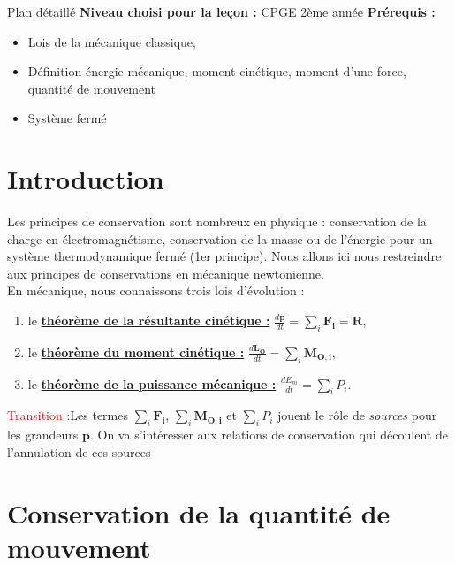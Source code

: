 \begin{reportBlock}{Plan détaillé}
  \textbf{Niveau choisi pour la leçon :} CPGE 2ème année
  \newline
  \textbf{Prérequis : }
  \begin{itemize}
      \item Lois de la mécanique classique,
      \item Définition énergie mécanique, moment cinétique, moment d'une force, quantité de mouvement
      \item Système fermé
  \end{itemize}


\section*{Introduction}
Les principes de conservation sont nombreux en physique : conservation de la charge en électromagnétisme, conservation de la masse ou de l'énergie pour un système thermodynamique fermé (1er principe). Nous allons ici nous restreindre aux principes de conservations en mécanique newtonienne.\\

En mécanique, nous connaissons trois lois d'évolution :
\begin{enumerate}
    \item le \underline{\textbf{théorème de la résultante cinétique :}} $\frac{d\mathbf{p}}{dt}=\sum_{i}\mathbf{F_i}=\mathbf{R}$,
    \item le \underline{\textbf{théorème du moment cinétique :}} $\frac{d\mathbf{L_O}}{dt}=\sum_{i}\mathbf{M_{O,i}}$,
    \item le \underline{\textbf{théorème de la puissance mécanique :}} $\frac{dE_m}{dt}=\sum_{i}P_i$.
\end{enumerate}

\textcolor{red}{Transition :}Les termes $\sum_{i}\mathbf{F_i}$, $\sum_{i}\mathbf{M_{O,i}}$ et $\sum_{i}P_i$ jouent le rôle de \textit{sources} pour les grandeurs $\mathbf{p}$. On va s'intéresser aux relations de conservation qui découlent de l'annulation de ces sources 

\section{Conservation de la quantité de mouvement}


\end{reportBlock}
